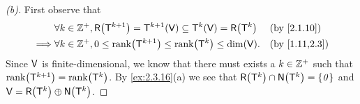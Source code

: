 \begin{proof}[(b)]
  First observe that
  \begin{align*}
             & \forall k \in \Z^+, \rg{\T^{k + 1}} = \T^{k + 1}(\V) \subseteq \T^k(\V) = \rg{\T^k} &  & \text{(by \cref{2.1.10})}   \\
    \implies & \forall k \in \Z^+, 0 \leq \rk{\T^{k + 1}} \leq \rk{\T^k} \leq \dim(\V).            &  & \text{(by \cref{1.11,2.3})}
  \end{align*}
  Since \(\mathsf{V}\) is finite-dimensional, we know that there must exists a \(k \in \mathbb{Z}^+\) such that \(\rk{\T^{k + 1}} = \rk{\T^k}\).
  By \cref{ex:2.3.16}(a) we see that \(\rg{\T^k} \cap \ns{\T^k} = \set{\zv}\) and \(\V = \rg{\T^k} \oplus \ns{\T^k}\).
\end{proof}
